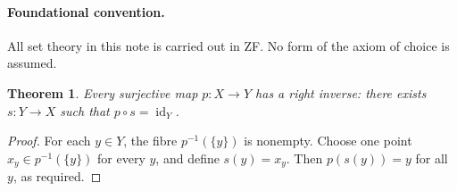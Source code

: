 \documentclass{article}
\newtheorem{theorem}{Theorem}
\begin{document}
\paragraph{Foundational convention.}
All set theory in this note is carried out in ZF. No form of the axiom of
choice is assumed.

\begin{theorem}\label{thm:choice-right-inverse}
Every surjective map $p:X\to Y$ has a right inverse: there exists
$s:Y\to X$ such that $p\circ s=\operatorname{id}_Y$.
\end{theorem}
\begin{proof}
For each $y\in Y$, the fibre $p^{-1}(\{y\})$ is nonempty. Choose one point
$x_y\in p^{-1}(\{y\})$ for every $y$, and define $s(y)=x_y$. Then
$p(s(y))=y$ for all $y$, as required.
\end{proof}
\end{document}
